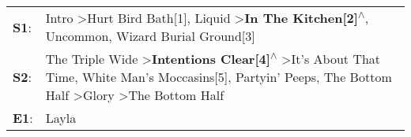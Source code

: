 \begin{supertabular}{p{0.03\textwidth}p{0.92\textwidth}}
 \textbf{S1}:  &                                                                                                                                       Intro\textsuperscript{} \textgreater \enspace Hurt Bird Bath[1]\textsuperscript{}, \enspace Liquid\textsuperscript{} \textgreater \enspace \textbf{In The Kitchen[2]\textsuperscript{$\wedge$}}, \enspace Uncommon\textsuperscript{}, \enspace Wizard Burial Ground[3]\textsuperscript{}  \enspace  \\
 \textbf{S2}:  &  The Triple Wide\textsuperscript{} \textgreater \enspace \textbf{Intentions Clear[4]\textsuperscript{$\wedge$}} \textgreater \enspace It's About That Time\textsuperscript{}, \enspace White Man's Moccasins[5]\textsuperscript{}, \enspace Partyin' Peeps\textsuperscript{}, \enspace The Bottom Half\textsuperscript{} \textgreater \enspace Glory\textsuperscript{} \textgreater \enspace The Bottom Half\textsuperscript{}  \enspace  \\
 \textbf{E1}:  &                                                                                                                                                                                                                                                                                                                                                                                                        Layla\textsuperscript{}  \enspace  \\
\end{supertabular}
